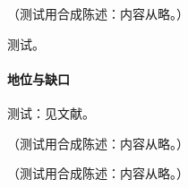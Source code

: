 \begin{corollary}\label{cor:lamet-principle-pt}
（测试用合成陈述：内容从略。）
\end{corollary}
\begin{proofsketch}测试。\end{proofsketch}
\paragraph{地位与缺口}测试：见文献。

\begin{remark}[批评与回应]\label{rem:lattice-critiques}
（测试用合成陈述：内容从略。）
\end{remark}

\begin{remark}[开放问题]\label{rem:lamet-open}
（测试用合成陈述：内容从略。）
\end{remark}
